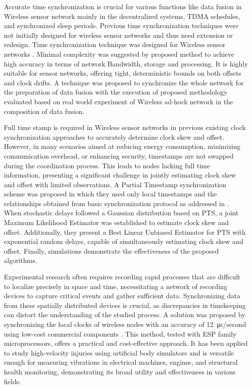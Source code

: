 Accurate time synchronization is crucial for various functions like data fusion in Wireless sensor network mainly in the decentralized systems, TDMA schedules, and synchronized sleep periods. Previous time synchronization techniques were not initially designed for wireless sensor networks and thus need extension or redesign. Time synchronization technique was designed for Wireless sensor networks \cite{sichitiu2003simple}. Minimal complexity was suggested by proposed method to achieve high accuracy in terms of network Bandwidth, storage and processing. It is highly suitable for sensor networks, offering tight, deterministic bounds on both offsets and clock drifts. A technique was proposed to synchronize the whole network for the preparation of data fusion with the execution of proposed methodology evaluated based on real world experiment of Wireless ad-hock network in the composition of data fusion.

Full time stamp is required in Wireless sensor networks in previous existing clock synchronization approaches to accurately determine clock skew and offset. However, in many scenarios aimed at reducing energy consumption, minimizing communication overhead, or enhancing security, timestamps are not swapped during the coordination process. This leads to nodes lacking full time information, presenting a significant challenge in jointly estimating clock skew and offset with limited observations. A Partial Timestamp synchronization scheme was proposed in which they used only local timestamps and the relationships obtained from basic synchronization protocol as addressed in \cite{wang2023clock}. When stochastic delays followed a Gaussian distribution based on PTS, a 
joint Maximum Likelihood Estimator was established to estimate clock skew and offset. Additionally, they present a Best Linear Unbiased 
Estimator for PTS with exponential random delays, capable of simultaneously estimating clock skew and offset. Finally, simulations demonstrate the effectiveness of the proposed algorithms.

Experimental research often requires recording rapid processes that are difficult to localize precisely in space and time, necessitating a network of recording devices to capture critical events and gather sufficient data. Synchronizing data from these spatially distributed devices is crucial, as discrepancies in timekeeping can distort the understanding of the studied process. A solution was proposed by synchronizing the local clocks of wireless nodes with an accuracy of  \SI{12}{\micro\second}/second using low-cost commercial components \cite{zuev2023wireless}. This method, tested with ESP family microprocessors, offers a practical and cost-effective approach. It has been applied to study high-velocity injuries using artificial body simulators and is versatile enough for measuring vibrations in electrical machines, engines, and structural health monitoring, demonstrating its broad utility and effectiveness in various fields.

